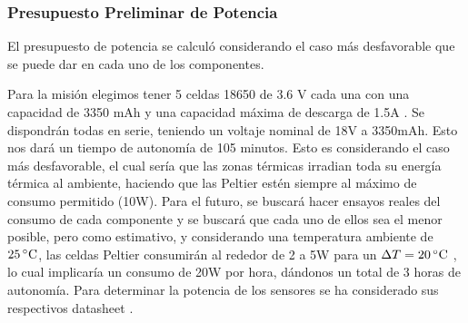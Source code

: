     \subsubsection{Presupuesto Preliminar de Potencia}
      El presupuesto de potencia se calculó considerando el caso más desfavorable que se puede dar en cada uno de los
      componentes.

      \begin{table}[H]
      \centering
      \caption{Consumo de corriente y potencia de los componentes en el caso más desfavorable.}
      \label{tab:consumo_componentes}
      \end{table}

      Para la misión elegimos tener 5 celdas 18650 de 3.6 V cada una con una capacidad de 3350 mAh y una capacidad
      máxima de descarga de 1.5A \cite{datasheet-cmicr18650-f9l}. Se dispondrán todas en serie, teniendo un voltaje
      nominal de 18V a 3350mAh. Esto nos dará un tiempo de autonomía de 105 minutos. Esto es considerando el caso más
      desfavorable, el cual sería que las zonas térmicas irradian toda su energía térmica al ambiente, haciendo que las
      Peltier estén siempre al máximo de consumo permitido (10W). Para el futuro, se buscará hacer ensayos reales del
      consumo de cada componente y se buscará que cada uno de ellos sea el menor posible, pero como estimativo, y
      considerando una temperatura ambiente de $25\,^\circ\mathrm{C}$, las celdas Peltier consumirán al rededor de 2 a 5W para un
      $\Delta T = 20\,^\circ\mathrm{C}$ \cite{datasheet-peltier}, lo cual implicaría un consumo de 20W por hora, dándonos un total
      de 3 horas de autonomía. Para determinar la potencia de los sensores se ha considerado sus respectivos datasheet
      \cite{datasheet-mpu9250} \cite{datasheet-bpm280}.
      
